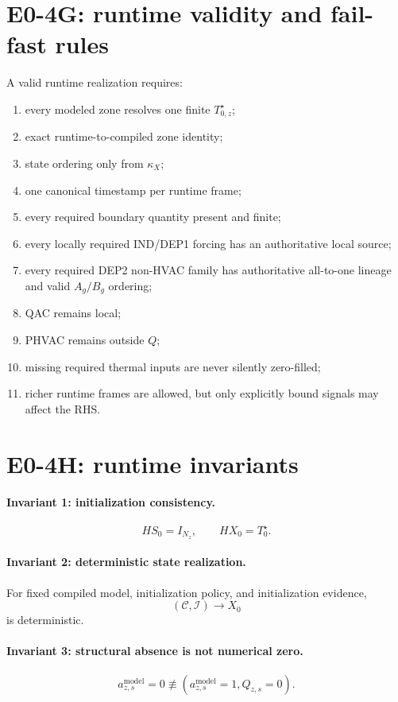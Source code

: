 \documentclass[11pt]{article}
\begin{document}
\section{E0-4G: runtime validity and fail-fast rules}
A valid runtime realization requires:
\begin{enumerate}[leftmargin=*]
\item every modeled zone resolves one finite \(T_{0,z}^{\star}\);
\item exact runtime-to-compiled zone identity;
\item state ordering only from \(\kappa_X\);
\item one canonical timestamp per runtime frame;
\item every required boundary quantity present and finite;
\item every locally required IND/DEP1 forcing has an authoritative local source;
\item every required DEP2 non-HVAC family has authoritative all-to-one lineage and valid \(A_g/B_g\) ordering;
\item QAC remains local;
\item PHVAC remains outside \(Q\);
\item missing required thermal inputs are never silently zero-filled;
\item richer runtime frames are allowed, but only explicitly bound signals may affect the RHS.
\end{enumerate}

\section{E0-4H: runtime invariants}
\paragraph{Invariant 1: initialization consistency.}
\[
\boxed{HS_0=I_{N_z}},\qquad\boxed{HX_0=T_0^\star}.
\]

\paragraph{Invariant 2: deterministic state realization.}
For fixed compiled model, initialization policy, and initialization evidence,
\[
\boxed{(\mathcal C,\mathcal I)\rightarrow X_0}
\]
is deterministic.

\paragraph{Invariant 3: structural absence is not numerical zero.}
\[
\boxed{a_{z,s}^{\mathrm{model}}=0\not\equiv(a_{z,s}^{\mathrm{model}}=1,Q_{z,s}=0)}.
\]
\end{document}

